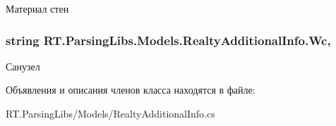 Материал стен 

\hypertarget{class_r_t_1_1_parsing_libs_1_1_models_1_1_realty_additional_info_aedcbc8e48fa63f3705c88bf73ed4a265}{
\subsubsection[{Wc}]{\setlength{\rightskip}{0pt plus 5cm}string R\+T.\+Parsing\+Libs.\+Models.\+Realty\+Additional\+Info.\+Wc\hspace{0.3cm}{\ttfamily [get]}, {\ttfamily [set]}}}\label{class_r_t_1_1_parsing_libs_1_1_models_1_1_realty_additional_info_aedcbc8e48fa63f3705c88bf73ed4a265}


Санузел 



Объявления и описания членов класса находятся в файле\+:\begin{DoxyCompactItemize}
\item 
R\+T.\+Parsing\+Libs/\+Models/Realty\+Additional\+Info.\+cs\end{DoxyCompactItemize}
